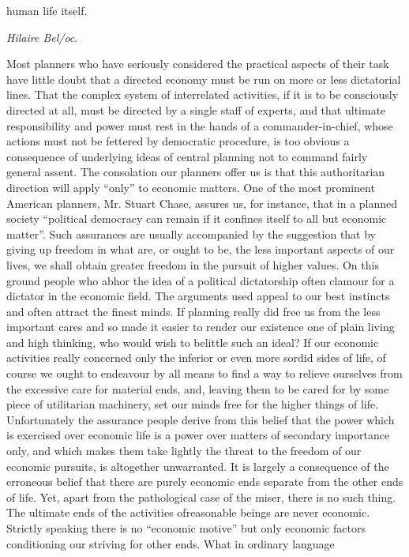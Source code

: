 \documentclass[11pt,openany]{book}
\begin{document}
human life itself.

\emph{Hilaire Bel/oc}.

Most planners who have seriously considered the practical aspects of their task have little doubt that a directed economy must be run on more or less dictatorial lines. That the complex system of interrelated activities, if it is to be consciously directed at all, must be directed by a single staff of experts, and that ultimate responsibility and power must rest in the hands of a commander-in-chief, whose actions must not be fettered by democratic procedure, is too obvious a consequence of underlying ideas of central planning not to command fairly general assent. The consolation our planners offer us is that this authoritarian direction will apply ``only'' to economic matters. One of the most prominent American planners, Mr. Stuart Chase, assures us, for instance, that in a planned society ``political democracy can remain if it confines itself to all but economic matter''. Such assurances are usually accompanied by the suggestion that by giving up freedom in what are, or ought to be, the less important aspects of our lives, we shall obtain greater freedom in the pursuit of higher values. On this ground people who abhor the idea of a political dictatorship often clamour for a dictator in the economic field. The arguments used appeal to our best instincts and often attract the finest minds. If planning really did free us from the less important cares and so made it easier to render our existence one of plain living and high thinking, who would wish to belittle such an ideal? If our economic activities really concerned only the inferior or even more sordid sides of life, of course we ought to endeavour by all means to find a way to relieve ourselves from the excessive care for material ends, and, leaving them to be cared for by some piece of utilitarian machinery, set our minds free for the higher things of life. Unfortunately the assurance people derive from this belief that the power which is exercised over economic life is a power over matters of secondary importance only, and which makes them take lightly the threat to the freedom of our economic pursuits, is altogether unwarranted. It is largely a consequence of the erroneous belief that there are purely economic ends separate from the other ends of life. Yet, apart from the pathological case of the miser, there is no such thing. The ultimate ends of the activities ofreasonable beings are never economic. Strictly speaking there is no ``economic motive'' but only economic factors conditioning our striving for other ends. What in ordinary language
\end{document}

